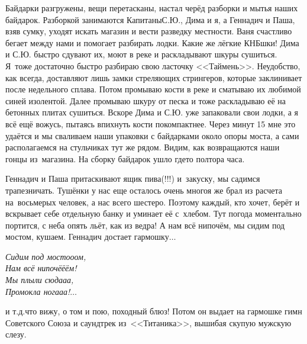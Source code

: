 \newpage
Байдарки разгружены, вещи перетасканы, настал черёд разборки и мытья наших байдарок. Разборкой занимаются Капитаны\mdash С.Ю., Дима и я, а Геннадич и Паша, взяв сумку, уходят искать магазин и вести разведку местности. Ваня счастливо бегает между нами и помогает разбирать лодки. Какие же лёгкие КНБ\sdash шки! Дима и С.Ю. быстро сдувают их, моют в реке и раскладывают шкуры сушиться. Я~тоже достаточно быстро разбираю свою ласточку <<Таймень>>. Неудобство, как всегда, доставляют лишь замки стреляющих стрингеров, которые заклинивает после недельного сплава. Потом промываю кости в реке и сматываю их любимой синей изолентой. Далее промываю шкуру от песка и тоже раскладываю её на бетонных плитах сушиться. Вскоре Дима и С.Ю. уже запаковали свои лодки, а я всё ещё вожусь, пытаясь впихнуть кости покомпактнее. Через минут 15 мне это удаётся и мы сваливаем наши упаковки с байдарками около опоры моста, а сами располагаемся на стульчиках тут же рядом. Видим, как возвращаются наши гонцы из~магазина. На сборку байдарок ушло где\sdash то полтора часа.

Геннадич и Паша притаскивают ящик пива(!!!) и~закуску, мы садимся трапезничать. Тушёнки у нас еще осталось очень много\mdash я же брал из расчета на~восьмерых человек, а нас всего шестеро. Поэтому каждый, кто хочет, берёт и вскрывает себе отдельную банку и уминает её с~хлебом. Тут погода моментально портится, с неба опять льёт, как из ведра! А нам всё нипочём, мы сидим под мостом, кушаем. Геннадич достает гармошку$\ldots$ %

\vspace{0.5cm}
\noindent\textit{%
\hspace*{3.5cm}Сидим под мосто\sdash о\sdash ом,\\
\hspace*{3.5cm}Нам всё нипочё\sdash ё\sdash ём!\\
\hspace*{3.5cm}Мы плыли сюда\sdash а\sdash а,\\ 
\hspace*{3.5cm}Промокла нога\sdash а\sdash а!$\ldots$ 
}

\newpage
\noindent и т.д.\mdash что вижу, о том и пою, походный блюз! Потом он выдает на гармошке гимн Советского Союза и саундтрек из~<<Титаника>>, вышибая скупую мужскую слезу. 

